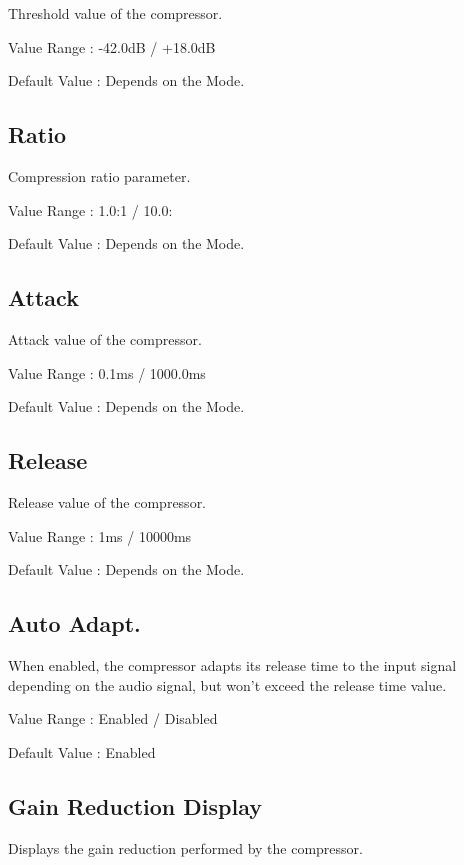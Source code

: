 \documentclass[
  letterpaper,
  DIV=11,
  numbers=noendperiod]{scrreport}
\begin{document}
Threshold value of the compressor.

Value Range : -42.0dB / +18.0dB

Default Value : Depends on the Mode.

\hypertarget{ratio}{%
\subsection{Ratio}\label{ratio}}

Compression ratio parameter.

Value Range : 1.0:1 / 10.0:

Default Value : Depends on the Mode.

\hypertarget{attack}{%
\subsection{Attack}\label{attack}}

Attack value of the compressor.

Value Range : 0.1ms / 1000.0ms

Default Value : Depends on the Mode.

\hypertarget{release}{%
\subsection{Release}\label{release}}

Release value of the compressor.

Value Range : 1ms / 10000ms

Default Value : Depends on the Mode.

\hypertarget{auto-adapt.}{%
\subsection{Auto Adapt.}\label{auto-adapt.}}

When enabled, the compressor adapts its release time to the input signal
depending on the audio signal, but won't exceed the release time value.

Value Range : Enabled / Disabled

Default Value : Enabled

\hypertarget{gain-reduction-display}{%
\subsection{Gain Reduction Display}\label{gain-reduction-display}}

Displays the gain reduction performed by the compressor.
\end{document}
